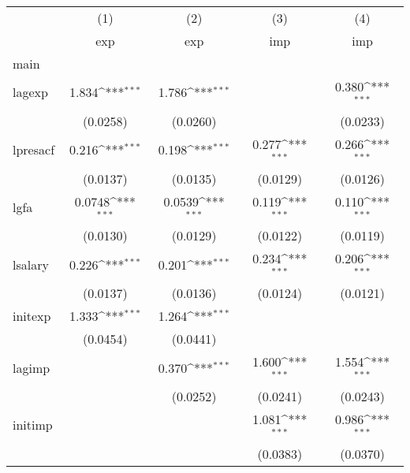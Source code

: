 {
\def\sym#1{\ifmmode^{#1}\else\(^{#1}\)\fi}
\begin{tabular}{l*{4}{c}}
\hline\hline
            &\multicolumn{1}{c}{(1)}&\multicolumn{1}{c}{(2)}&\multicolumn{1}{c}{(3)}&\multicolumn{1}{c}{(4)}\\
            &\multicolumn{1}{c}{exp}&\multicolumn{1}{c}{exp}&\multicolumn{1}{c}{imp}&\multicolumn{1}{c}{imp}\\
\hline
main        &                     &                     &                     &                     \\
lagexp      &       1.834\sym{***}&       1.786\sym{***}&                     &       0.380\sym{***}\\
            &    (0.0258)         &    (0.0260)         &                     &    (0.0233)         \\
[1em]
lpresacf    &       0.216\sym{***}&       0.198\sym{***}&       0.277\sym{***}&       0.266\sym{***}\\
            &    (0.0137)         &    (0.0135)         &    (0.0129)         &    (0.0126)         \\
[1em]
lgfa        &      0.0748\sym{***}&      0.0539\sym{***}&       0.119\sym{***}&       0.110\sym{***}\\
            &    (0.0130)         &    (0.0129)         &    (0.0122)         &    (0.0119)         \\
[1em]
lsalary     &       0.226\sym{***}&       0.201\sym{***}&       0.234\sym{***}&       0.206\sym{***}\\
            &    (0.0137)         &    (0.0136)         &    (0.0124)         &    (0.0121)         \\
[1em]
initexp     &       1.333\sym{***}&       1.264\sym{***}&                     &                     \\
            &    (0.0454)         &    (0.0441)         &                     &                     \\
[1em]
lagimp      &                     &       0.370\sym{***}&       1.600\sym{***}&       1.554\sym{***}\\
            &                     &    (0.0252)         &    (0.0241)         &    (0.0243)         \\
[1em]
initimp     &                     &                     &       1.081\sym{***}&       0.986\sym{***}\\
            &                     &                     &    (0.0383)         &    (0.0370)         \\

\end{tabular}}
